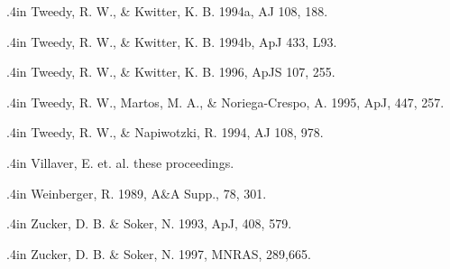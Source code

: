 \begin{references}
\par {} \noindent \hangindent .4in  Tweedy, R. W., \& Kwitter, K. B. 1994a, AJ 108, 188.
\par {} \noindent \hangindent .4in  Tweedy, R. W., \& Kwitter, K. B. 1994b, ApJ 433, L93.
\par {} \noindent \hangindent .4in  Tweedy, R. W., \& Kwitter, K. B. 1996, ApJS 107, 255.
\par {} \noindent \hangindent .4in  Tweedy, R. W., Martos, M. A., \& Noriega-Crespo, A. 1995,
ApJ, 447, 257.
\par {} \noindent \hangindent .4in  Tweedy, R. W., \& Napiwotzki, R. 1994, AJ 108, 978.
\par {} \noindent \hangindent .4in  Villaver, E. et. al. these proceedings.
\par {} \noindent \hangindent .4in  Weinberger, R. 1989, A\&A Supp., 78, 301.
\par {} \noindent \hangindent .4in  Zucker, D. B. \& Soker, N. 1993, ApJ, 408, 579.
\par {} \noindent \hangindent .4in  Zucker, D. B. \& Soker, N. 1997, MNRAS, 289,665.
\end{references}

